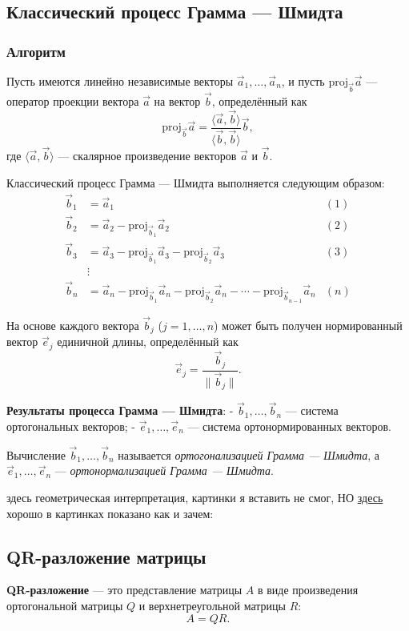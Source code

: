 \documentclass[12pt]{article}
\begin{document}
\subsection*{Классический процесс Грамма — Шмидта}

\subsubsection*{Алгоритм}
Пусть имеются линейно независимые векторы $\vec{a}_1, \dots, \vec{a}_n$, и пусть $\mathrm{proj}_{\vec{b}} \vec{a}$ — оператор проекции вектора $\vec{a}$ на вектор $\vec{b}$, определённый как  
$$
\mathrm{proj}_{\vec{b}} \vec{a} = \frac{\langle \vec{a}, \vec{b} \rangle}{\langle \vec{b}, \vec{b} \rangle} \vec{b},
$$  
где $\langle \vec{a}, \vec{b} \rangle$ — скалярное произведение векторов $\vec{a}$ и $\vec{b}$.

Классический процесс Грамма — Шмидта выполняется следующим образом:
\begin{align*}
\vec{b}_1 &= \vec{a}_1 & (1) \\
\vec{b}_2 &= \vec{a}_2 - \mathrm{proj}_{\vec{b}_1} \vec{a}_2 & (2) \\
\vec{b}_3 &= \vec{a}_3 - \mathrm{proj}_{\vec{b}_1} \vec{a}_3 - \mathrm{proj}_{\vec{b}_2} \vec{a}_3 & (3) \\
&\vdots \\
\vec{b}_n &= \vec{a}_n - \mathrm{proj}_{\vec{b}_1} \vec{a}_n - \mathrm{proj}_{\vec{b}_2} \vec{a}_n - \cdots - \mathrm{proj}_{\vec{b}_{n-1}} \vec{a}_n & (n)
\end{align*}

На основе каждого вектора $\vec{b}_j$ ($j = 1, \dots, n$) может быть получен нормированный вектор $\vec{e}_j$ единичной длины, определённый как  
$$
\vec{e}_j = \frac{\vec{b}_j}{\|\vec{b}_j\|}.
$$

\textbf{Результаты процесса Грамма — Шмидта}:  
- $\vec{b}_1, \dots, \vec{b}_n$ — система ортогональных векторов;  
- $\vec{e}_1, \dots, \vec{e}_n$ — система ортонормированных векторов.  

Вычисление $\vec{b}_1, \dots, \vec{b}_n$ называется \textit{ортогонализацией Грамма — Шмидта}, а $\vec{e}_1, \dots, \vec{e}_n$ — \textit{ортонормализацией Грамма — Шмидта}.


здесь геометрическая интерпретация, картинки я вставить не смог, НО \href{https://ru.wikipedia.org/wiki/Процесс_Грама_―_Шмидта}{здесь} хорошо в картинках показано как и зачем:


\subsection*{QR-разложение матрицы}
\textbf{QR-разложение} — это представление матрицы $A$ в виде произведения ортогональной матрицы $Q$ и верхнетреугольной матрицы $R$:  
$$
A = QR.
$$
\end{document}
